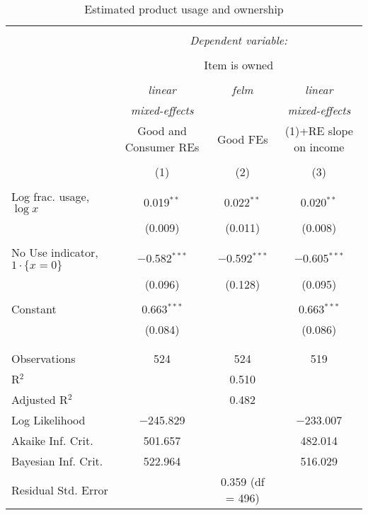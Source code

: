 
\begin{table}[!htbp] \centering 
  \caption{Estimated product usage and ownership} 
  \label{tab:ownership} 
\begin{tabular}{@{\extracolsep{5pt}}lccc} 
\\[-1.8ex]\hline 
\hline \\[-1.8ex] 
 & \multicolumn{3}{c}{\textit{Dependent variable:}} \\ 
\cline{2-4} 
\\[-1.8ex] & \multicolumn{3}{c}{Item is owned} \\ 
\\[-1.8ex] & \textit{linear} & \textit{felm} & \textit{linear} \\ 
 & \textit{mixed-effects} & \textit{} & \textit{mixed-effects} \\ 
 & Good and Consumer REs & Good FEs & (1)+RE slope on income \\ 
\\[-1.8ex] & (1) & (2) & (3)\\ 
\hline \\[-1.8ex] 
 Log frac. usage, $\log x$ & 0.019$^{**}$ & 0.022$^{**}$ & 0.020$^{**}$ \\ 
  & (0.009) & (0.011) & (0.008) \\ 
  & & & \\ 
 No Use indicator, $1\cdot\{x = 0\}$ & $-$0.582$^{***}$ & $-$0.592$^{***}$ & $-$0.605$^{***}$ \\ 
  & (0.096) & (0.128) & (0.095) \\ 
  & & & \\ 
 Constant & 0.663$^{***}$ &  & 0.663$^{***}$ \\ 
  & (0.084) &  & (0.086) \\ 
  & & & \\ 
\hline \\[-1.8ex] 
Observations & 524 & 524 & 519 \\ 
R$^{2}$ &  & 0.510 &  \\ 
Adjusted R$^{2}$ &  & 0.482 &  \\ 
Log Likelihood & $-$245.829 &  & $-$233.007 \\ 
Akaike Inf. Crit. & 501.657 &  & 482.014 \\ 
Bayesian Inf. Crit. & 522.964 &  & 516.029 \\ 
Residual Std. Error &  & 0.359 (df = 496) &  \\ 

\end{tabular}
\end{table}
